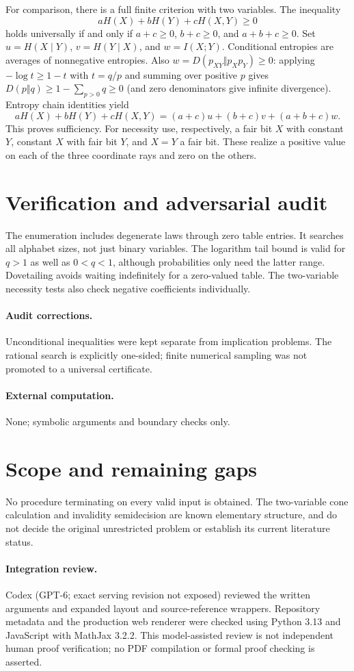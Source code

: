 \documentclass[11pt]{article}
\begin{document}
For comparison, there is a full finite criterion with two variables. The inequality
\[
 aH(X)+bH(Y)+cH(X,Y)\geq0
\]
holds universally if and only if $a+c\geq0$, $b+c\geq0$, and $a+b+c\geq0$. Set $u=H(X\mid Y)$, $v=H(Y\mid X)$, and $w=I(X;Y)$. Conditional entropies are averages of nonnegative entropies. Also $w=D(p_{XY}\Vert p_Xp_Y)\geq0$: applying $-\log t\geq1-t$ with $t=q/p$ and summing over positive $p$ gives $D(p\Vert q)\geq1-\sum_{p>0}q\geq0$ (and zero denominators give infinite divergence). Entropy chain identities yield
\[
 aH(X)+bH(Y)+cH(X,Y)=(a+c)u+(b+c)v+(a+b+c)w.
\]
This proves sufficiency. For necessity use, respectively, a fair bit $X$ with constant $Y$, constant $X$ with fair bit $Y$, and $X=Y$ a fair bit. These realize a positive value on each of the three coordinate rays and zero on the others.
\section{Verification and adversarial audit}
The enumeration includes degenerate laws through zero table entries. It searches all alphabet sizes, not just binary variables. The logarithm tail bound is valid for $q>1$ as well as $0<q<1$, although probabilities only need the latter range. Dovetailing avoids waiting indefinitely for a zero-valued table. The two-variable necessity tests also check negative coefficients individually.
\paragraph{Audit corrections.} Unconditional inequalities were kept separate from implication problems. The rational search is explicitly one-sided; finite numerical sampling was not promoted to a universal certificate.
\paragraph{External computation.} None; symbolic arguments and boundary checks only.
\section{Scope and remaining gaps}
No procedure terminating on every valid input is obtained. The two-variable cone calculation and invalidity semidecision are known elementary structure, and do not decide the original unrestricted problem or establish its current literature status.
\paragraph{Integration review.} Codex (GPT-6; exact serving revision not exposed) reviewed the written arguments and expanded layout and source-reference wrappers. Repository metadata and the production web renderer were checked using Python 3.13 and JavaScript with MathJax 3.2.2. This model-assisted review is not independent human proof verification; no PDF compilation or formal proof checking is asserted.
\end{document}
